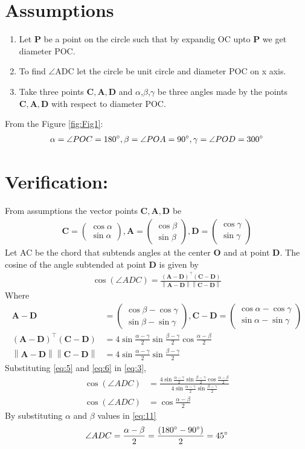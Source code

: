 \documentclass[12pt]{article}
\providecommand{\norm}[1]{\left\lVert#1\right\rVert}
\newcommand{\myvec}[1]{\ensuremath{\begin{pmatrix}#1\end{pmatrix}}}
\let\vec\mathbf
\begin{document}
\section*{\large Assumptions}
\begin{enumerate}
	\item Let $\vec{P}$ be a point on the circle such that by expandig OC upto $\vec{P}$ we get diameter POC.
\item To find $\angle$ADC let the circle be unit circle and diameter POC on x axis.
\item Take three points $\vec{C},\vec{A},\vec{D}$ and $\alpha$,$\beta$,$\gamma$ be three angles made by the points $\vec{C},\vec{A},\vec{D}$ with respect to diameter POC.
\end{enumerate}
From the Figure \ref{fig:Fig1}:
\begin{align}
\alpha = {\angle POC}= 180\degree, 
\beta= {\angle POA} = 90\degree,
\gamma = {\angle POD}=300\degree
\end{align}
\section*{Verification:}
From assumptions the vector points $\vec{C},\vec{A},\vec{D}$ be
\begin{align}
	\vec{C} = \myvec{\cos\alpha\\\sin\alpha},
	\vec{A} = \myvec{\cos\beta\\\sin\beta},
	\vec{D} = \myvec{\cos\gamma\\\sin\gamma}
\end{align}
Let AC be the chord that subtends angles at the center $\vec{O}$ and at point $\vec{D}$. The cosine of the angle subtended at point $\vec{D}$ is given by
\begin{align}
	\cos(\angle ADC) = \frac{\vec{(A-D)^\top(C-D)}}{\norm{\vec{A-D}}\norm{\vec{C-D}}}
	\label{eq:3}
\end{align}
Where
 \begin{align}
	 \vec{A-D}& = \myvec{\cos\beta - \cos\gamma\\\sin\beta - \sin\gamma},
	 \vec{C-D} = \myvec{\cos\alpha - \cos\gamma\\\sin\alpha - \sin\gamma}\\
	 \label{eq:5} \vec{(A-D)^\top(C-D)}&= 4\sin\frac{\alpha-\gamma}2\sin\frac{\beta-\gamma}2\cos\frac{\alpha-\beta}2\\
	 \norm{\vec{A-D}}\norm{\vec{C-D}}& = 4 \sin\frac{\alpha-\gamma}2\sin\frac{\beta-\gamma}2
	\label{eq:6}
\end{align}
Substituting \eqref{eq:5} and \eqref{eq:6} in \eqref{eq:3},
\begin{align}
	\cos(\angle ADC) &= \frac{4\sin\frac{\alpha-\gamma}{2}\sin\frac{\beta-\gamma}{2}\cos\frac{\alpha-\beta}{2}}{4 \sin\frac{\alpha-\gamma}2\sin\frac{\beta-\gamma}2}\\
	\cos(\angle ADC) &= \cos\frac{\alpha-\beta}{2}
	\label{eq:11}
\end{align}
By substituting $\alpha$ and $\beta$ values in \eqref{eq:11}
\begin{align}
\angle ADC = \frac{\alpha-\beta}{2}=\frac{(180\degree - 90\degree )}{2}=45\degree
\end{align}
\end{document}
